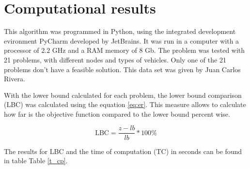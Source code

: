 \documentclass[10pt,twoside]{article}
\begin{document}
\section{Computational results}\label{sec_results}
This algorithm was programmed in Python, using the integrated
development evironment PyCharm developed by JetBrains. It was run in a
computer with a processor of $2.2$ GHz and a RAM memory of $8$
Gb. The problem was tested with 21 problems, with different nodes and
types of vehicles. Only one of the 21 problems don't have a feasible
solution. This data set was given by Juan Carlos Rivera.

With the lower bound calculated for each problem, the lower bound
comparison (LBC) was calculated using the equation \ref{eq:er}. This measure allows to calculate how far is the objective function compared to the lower bound percent wise.

\begin{equation}
  \label{eq:er}
  \text{LBC} = \frac{z - lb}{lb} * 100\%
\end{equation}

The results for LBC and the time of computation (TC) in seconds can be
found in table Table \ref{t_cp}.
\end{document}
